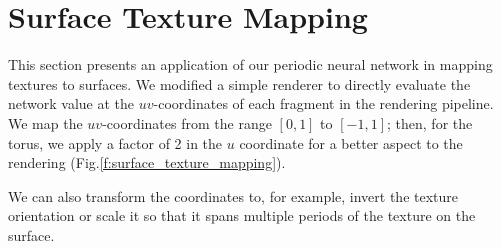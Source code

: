 
\section{Surface Texture Mapping}

This section presents an application of our periodic neural network in mapping textures to surfaces. We modified a simple renderer to directly evaluate the network value at the $uv$-coordinates of each fragment in the rendering pipeline. We map the $uv$-coordinates from the range $[0, 1]$ to  $[-1, 1]$; then, for the torus, we apply a factor of 2 in the $u$ coordinate for a better aspect to the rendering (Fig.\ref{f:surface_texture_mapping}). 

We can also transform the coordinates to, for example, invert the texture orientation or scale it so that it spans multiple periods of the texture on the surface.

